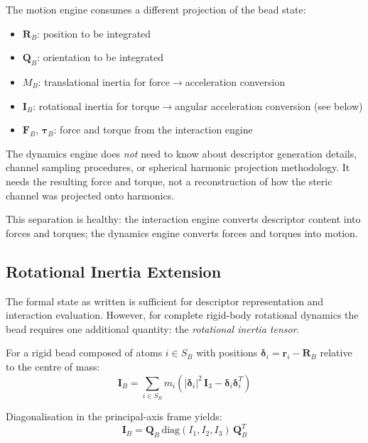 \documentclass[11pt]{article}
\begin{document}
The motion engine consumes a different projection of the bead state:
\begin{itemize}
    \item $\mathbf{R}_B$: position to be integrated
    \item $\mathbf{Q}_B$: orientation to be integrated
    \item $M_B$: translational inertia for force$\to$acceleration conversion
    \item $\mathbf{I}_B$: rotational inertia for torque$\to$angular acceleration
          conversion (see below)
    \item $\mathbf{F}_B$, $\boldsymbol{\tau}_B$: force and torque from the
          interaction engine
\end{itemize}

The dynamics engine does \emph{not} need to know about descriptor generation
details, channel sampling procedures, or spherical harmonic projection
methodology.  It needs the resulting force and torque, not a reconstruction
of how the steric channel was projected onto harmonics.

This separation is healthy: the interaction engine converts descriptor
content into forces and torques; the dynamics engine converts forces and
torques into motion.

\subsection{Rotational Inertia Extension}

The formal state as written is sufficient for descriptor representation and
interaction evaluation.  However, for complete rigid-body rotational
dynamics the bead requires one additional quantity: the \emph{rotational
inertia tensor}.

For a rigid bead composed of atoms $i \in S_B$ with positions
$\boldsymbol{\delta}_i = \mathbf{r}_i - \mathbf{R}_B$ relative to the
centre of mass:
\begin{equation}
    \mathbf{I}_B = \sum_{i \in S_B} m_i
    \left( |\boldsymbol{\delta}_i|^2 \,\mathbf{I}_{3}
           - \boldsymbol{\delta}_i \boldsymbol{\delta}_i^T \right)
\end{equation}

Diagonalisation in the principal-axis frame yields:
\begin{equation}
    \mathbf{I}_B = \mathbf{Q}_B \,
    \mathrm{diag}(I_1, I_2, I_3) \,
    \mathbf{Q}_B^T
\end{equation}
\end{document}
